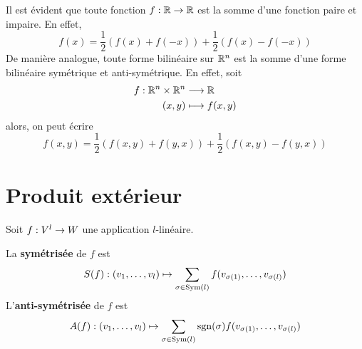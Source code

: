 Il est évident que toute fonction $f: \mathbb{R} \rightarrow \mathbb{R}$ est la somme d'une fonction paire et impaire. En effet,
 $$f(x) = \frac{1}{2}(f(x) + f(-x)) + \frac{1}{2}(f(x) - f(-x))$$
 De manière analogue, toute forme bilinéaire sur $\mathbb{R}^n$ est la somme d'une forme bilinéaire symétrique et anti-symétrique. En effet, soit
 \begin{align*}
   f: \mathbb{R}^n \times \mathbb{R}^n &\longrightarrow \mathbb{R} \\
   (x, y)&\longmapsto f(x, y)
\end{align*}
alors, on peut écrire
$$f(x, y) = \frac{1}{2}(f(x, y) + f(y, x)) + \frac{1}{2}(f(x, y) - f(y, x))$$

\section{Produit extérieur}
\begin{definition}
  Soit $f: V^l \rightarrow W$ une application $l$-linéaire.
  \par La \textbf{symétrisée} de $f$ est
  $$S(f): (v_1, \dots, v_l) \mapsto \sum_{\sigma \in \operatorname{Sym}(l)} f(v_{\sigma(1)}, \dots, v_{\sigma(l)})$$
  L'\textbf{anti-symétrisée} de $f$ est
  $$A(f): (v_1, \dots, v_l) \mapsto \sum_{\sigma \in \operatorname{Sym}(l)} \operatorname{sgn}(\sigma) f(v_{\sigma(1)}, \dots, v_{\sigma(l)})$$
\end{definition}

